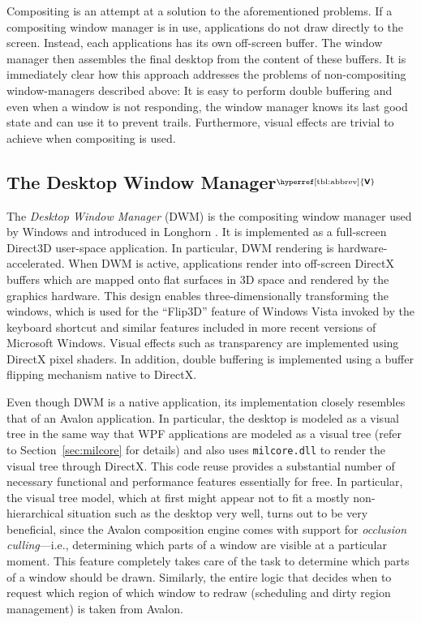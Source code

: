 \documentclass[10pt,twocolumn,a4paper]{article}
\newcommand{\bs}[1]{\textbf{\sffamily #1}}
\newcommand{\winver}[1]{$^{\text{\hyperref[tbl:abbrev]{\bs{#1}}}}$}
\newcommand{\winsubsection}[2]{\subsection[#1]{#1\winver{#2}}}
\begin{document}
			Compositing is an attempt at a solution to the aforementioned
			problems.  If a compositing window manager is in use, applications
			do not draw directly to the screen. Instead, each applications has
			its own off-screen buffer. The
			window manager then assembles the final
			desktop from the content of these buffers. It is immediately clear how this approach addresses the
			problems of non-compositing window-managers described above: It is
			easy to perform double buffering and even when a window is not
			responding, the window manager knows its last good state and can
			use it to prevent trails. Furthermore, visual effects are trivial
			to achieve when compositing is used. \cite{dwmoverview}

		\winsubsection{The Desktop Window Manager}{V}\label{sec:dwm}
			The \emph{Desktop Window Manager} (DWM) is the compositing window
			manager used by Windows and introduced in Longhorn
			\cite{dwmoverview}.  It is implemented as a full-screen Direct3D
			user-space application. In particular, DWM rendering is
			hardware-accelerated. When DWM is active, applications render into
			off-screen DirectX buffers which are mapped onto flat surfaces in
			3D space and rendered by the graphics hardware. This design enables
			three-dimensionally transforming the windows, which is used for the
			\enquote{Flip3D} feature of Windows Vista invoked by the keyboard
			shortcut  and similar features included in more
			recent versions of Microsoft Windows. Visual effects such as
			transparency are implemented using DirectX pixel shaders. In addition,
			double buffering is implemented using a buffer flipping mechanism
			native to DirectX.
			\cite{dwmdirectx}

			Even though DWM is a native application, its implementation closely
			resembles that of an Avalon application. In particular, the desktop
			is modeled as a visual tree in the same way that WPF applications
			are modeled as a visual tree (refer to Section~\ref{sec:milcore}
			for details) and also uses \texttt{milcore.dll} to render the
			visual tree through DirectX. This code reuse provides a
			substantial number of necessary functional and performance
			features essentially for free.  In particular, the visual tree
			model, which at first might appear not to fit a mostly
			non-hierarchical situation such as the desktop very well,
			turns out to be very beneficial, since the Avalon composition
			engine comes with support for \emph{occlusion culling}---i.e.,
			determining which parts of a window are visible at a particular
			moment. This feature completely takes care of the task to
			determine which parts of a window should be drawn. Similarly, the
			entire logic that decides when to request which region of which window
			to redraw (scheduling and dirty region management) is taken from
			Avalon.
			\cite{dwmwpf}
\end{document}
